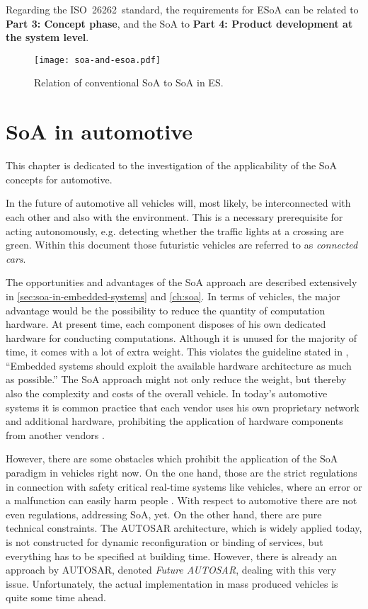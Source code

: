 Regarding the \mbox{ISO 26262 standard}, the requirements for ESoA can be related to \textbf{Part 3: Concept phase}, and the SoA to \textbf{Part 4: Product development at the system level}.


\begin{figure}[!htbp]
\centering
\texttt{[image: soa-and-esoa.pdf]}
\caption{Relation of conventional SoA to SoA in ES.}
\label{fig:soa-and-esoa}
\end{figure}







\section{SoA in automotive}
\label{sec:soa-in-automotive}

This chapter is dedicated to the investigation of the applicability of the SoA concepts for automotive.

In the future of automotive all vehicles will, most likely, be interconnected with each other and also with the environment. This is a necessary prerequisite for acting autonomously, e.g. detecting whether the traffic lights at a crossing are green. Within this document those futuristic vehicles are referred to as \emph{connected cars}.

The opportunities and advantages of the SoA approach are described extensively in \ref{sec:soa-in-embedded-systems} and \ref{ch:soa}. In terms of vehicles, the major advantage would be the possibility to reduce the quantity of computation hardware. At present time, each component disposes of his own dedicated hardware for conducting computations. Although it is unused for the majority of time, it comes with a lot of extra weight. This violates the guideline stated in \cite[p.7]{marwedel}, ``Embedded systems should exploit the available hardware architecture as much as possible.'' The SoA approach might not only reduce the weight, but thereby also the complexity and costs of the overall vehicle. In today's automotive systems it is common practice that each vendor uses his own proprietary network and additional hardware, prohibiting the application of hardware components from another vendors \cite{sommer}.

However, there are some obstacles which prohibit the application of the SoA paradigm in vehicles right now. On the one hand, those are the strict regulations in connection with safety critical real-time systems like vehicles, where an error or a malfunction can easily harm people \cite{kum}. With respect to automotive there are not even regulations, addressing SoA, yet. On the other hand, there are pure technical constraints. The AUTOSAR architecture, which is widely applied today, is not constructed for dynamic reconfiguration or binding of services, but everything has to be specified at building time. However, there is already an approach by AUTOSAR, denoted \emph{Future AUTOSAR}, dealing with this very issue. Unfortunately, the actual implementation in mass produced vehicles is quite some time ahead.

